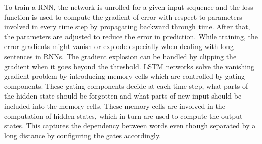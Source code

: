 \documentclass[a4paper, 11pt]{article}
\newcommand{\R}{\mathbb{R}}
\begin{document}
To train a RNN, the network is unrolled for a given input sequence and the loss function is used to compute the gradient of error with respect to parameters involved in every time step by propagating backward through time. After that, the parameters are adjusted to reduce the error in prediction\cite{Werbos1990}. While training, the error gradients might vanish or explode especially when dealing with long sentences in RNNs. The gradient explosion can be handled by clipping the gradient when it goes beyond the threshold. LSTM networks \cite{Hochreiter1997} solve the vanishing gradient problem by introducing memory cells which are controlled by gating components. These gating components decide at each time step, what parts of the hidden state should be forgotten and what parts of new input should be included into the memory cells. These memory cells are involved in the computation of hidden states, which in turn are used to compute the output states. This captures the dependency between words even though separated by a long distance by configuring the gates accordingly.

\end{document}
